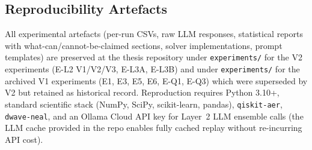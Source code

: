 \begin{appendices}
\chapter{Reproducibility Artefacts}

All experimental artefacts (per-run CSVs, raw LLM responses, statistical
reports with what-can/cannot-be-claimed sections, solver implementations,
prompt templates) are preserved at the thesis repository under
\texttt{experiments/} for the V2 experiments (E-L2 V1/V2/V3, E-L3A, E-L3B)
and under \texttt{experiments/} for the archived V1 experiments (E1, E3, E5,
E6, E-Q1, E-Q3) which were superseded by V2 but retained as historical
record. Reproduction requires Python 3.10+, standard scientific stack
(NumPy, SciPy, scikit-learn, pandas), \texttt{qiskit-aer},
\texttt{dwave-neal}, and an Ollama Cloud API key for Layer~2 LLM ensemble
calls (the LLM cache provided in the repo enables fully cached replay
without re-incurring API cost).

\end{appendices}
